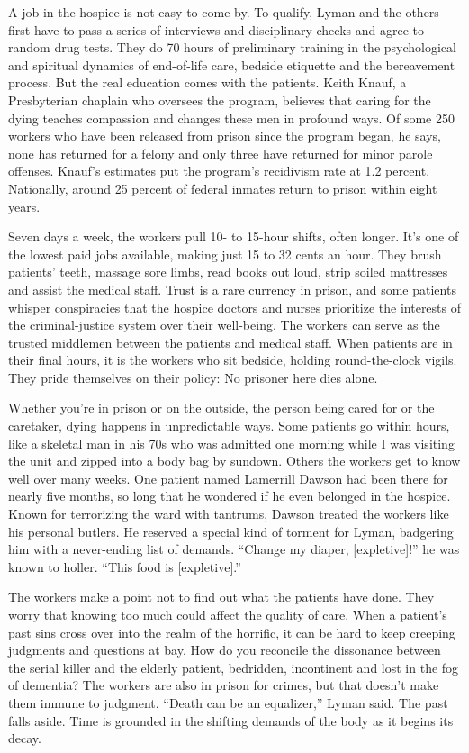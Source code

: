 A job in the hospice is not easy to come by. To qualify, Lyman and the
others first have to pass a series of interviews and disciplinary checks
and agree to random drug tests. They do 70 hours of preliminary training
in the psychological and spiritual dynamics of end-of-life care, bedside
etiquette and the bereavement process. But the real education comes with
the patients. Keith Knauf, a Presbyterian chaplain who oversees the
program, believes that caring for the dying teaches compassion and
changes these men in profound ways. Of some 250 workers who have been
released from prison since the program began, he says, none has returned
for a felony and only three have returned for minor parole offenses.
Knauf's estimates put the program's recidivism rate at 1.2 percent.
Nationally, around 25 percent of federal inmates return to prison within
eight years.

Seven days a week, the workers pull 10- to 15-hour shifts, often longer.
It's one of the lowest paid jobs available, making just 15 to 32 cents
an hour. They brush patients' teeth, massage sore limbs, read books out
loud, strip soiled mattresses and assist the medical staff. Trust is a
rare currency in prison, and some patients whisper conspiracies that the
hospice doctors and nurses prioritize the interests of the
criminal-justice system over their well-being. The workers can serve as
the trusted middlemen between the patients and medical staff. When
patients are in their final hours, it is the workers who sit bedside,
holding round-the-clock vigils. They pride themselves on their policy:
No prisoner here dies alone.

Whether you're in prison or on the outside, the person being cared for
or the caretaker, dying happens in unpredictable ways. Some patients go
within hours, like a skeletal man in his 70s who was admitted one
morning while I was visiting the unit and zipped into a body bag by
sundown. Others the workers get to know well over many weeks. One
patient named Lamerrill Dawson had been there for nearly five months, so
long that he wondered if he even belonged in the hospice. Known for
terrorizing the ward with tantrums, Dawson treated the workers like his
personal butlers. He reserved a special kind of torment for Lyman,
badgering him with a never-ending list of demands. ``Change my diaper,
{[}expletive{]}!'' he was known to holler. ``This food is
{[}expletive{]}.''

The workers make a point not to find out what the patients have done.
They worry that knowing too much could affect the quality of care. When
a patient's past sins cross over into the realm of the horrific, it can
be hard to keep creeping judgments and questions at bay. How do you
reconcile the dissonance between the serial killer and the elderly
patient, bedridden, incontinent and lost in the fog of dementia? The
workers are also in prison for crimes, but that doesn't make them immune
to judgment. ``Death can be an equalizer,'' Lyman said. The past falls
aside. Time is grounded in the shifting demands of the body as it begins
its decay.

